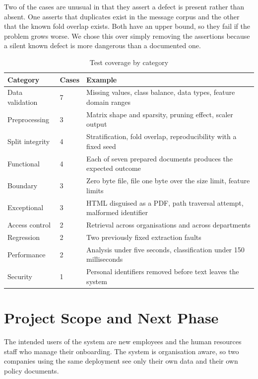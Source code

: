 \documentclass[conference]{IEEEtran}
\begin{document}
Two of the cases are unusual in that they assert a defect is present rather than absent. One asserts that duplicates exist in the message corpus and the other that the known fold overlap exists. Both have an upper bound, so they fail if the problem grows worse. We chose this over simply removing the assertions because a silent known defect is more dangerous than a documented one.

\begin{table}[!t]
\centering
\caption{Test coverage by category}
\footnotesize
\setlength{\tabcolsep}{3pt}
\begin{tabular}{p{}p{}p{}}
\toprule
\textbf{Category} & \textbf{Cases} & \textbf{Example} \\
\midrule
Data validation & 7 & Missing values, class balance, data types, feature domain ranges \\
Preprocessing & 3 & Matrix shape and sparsity, pruning effect, scaler output \\
Split integrity & 4 & Stratification, fold overlap, reproducibility with a fixed seed \\
Functional & 4 & Each of seven prepared documents produces the expected outcome \\
Boundary & 3 & Zero byte file, file one byte over the size limit, feature limits \\
Exceptional & 3 & HTML disguised as a PDF, path traversal attempt, malformed identifier \\
Access control & 2 & Retrieval across organisations and across departments \\
Regression & 2 & Two previously fixed extraction faults \\
Performance & 2 & Analysis under five seconds, classification under 150 milliseconds \\
Security & 1 & Personal identifiers removed before text leaves the system \\
\bottomrule
\end{tabular}
\end{table}

\section{Project Scope and Next Phase}
The intended users of the system are new employees and the human resources staff who manage their onboarding. The system is organisation aware, so two companies using the same deployment see only their own data and their own policy documents.
\end{document}
